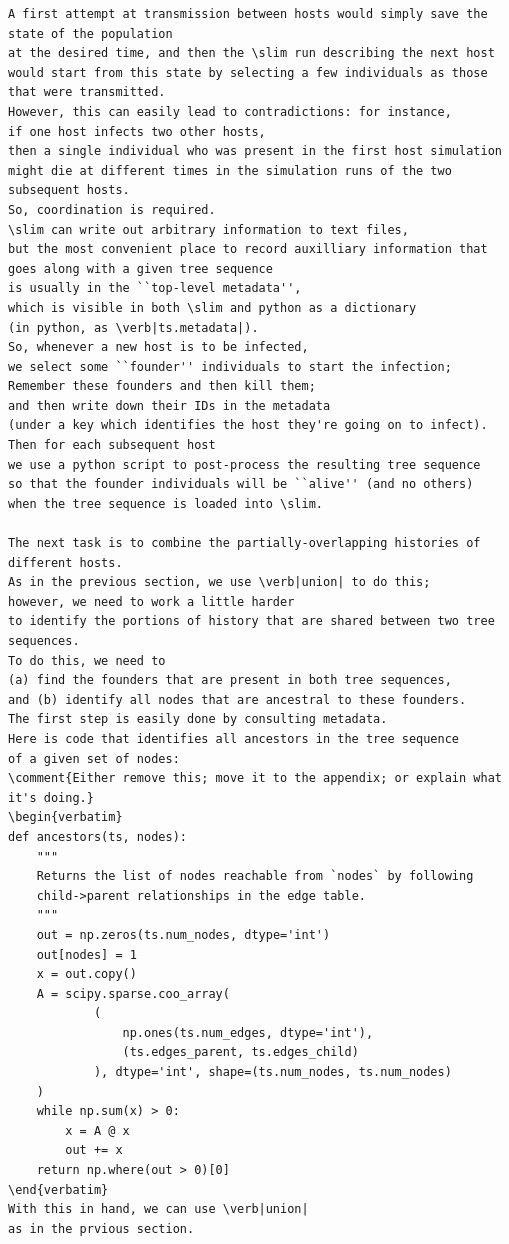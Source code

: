 \documentclass[12pt]{article}
\newcommand{\slim}[0]{\texttt{SLiM}\xspace}
\newcommand{\comment}[1]{\textit{\color{green} #1}}
\begin{document}
\begin{lstlisting}[language=slim]
A first attempt at transmission between hosts would simply save the state of the population
at the desired time, and then the \slim run describing the next host
would start from this state by selecting a few individuals as those that were transmitted.
However, this can easily lead to contradictions: for instance,
if one host infects two other hosts,
then a single individual who was present in the first host simulation
might die at different times in the simulation runs of the two subsequent hosts.
So, coordination is required.
\slim can write out arbitrary information to text files,
but the most convenient place to record auxilliary information that goes along with a given tree sequence
is usually in the ``top-level metadata'',
which is visible in both \slim and python as a dictionary
(in python, as \verb|ts.metadata|).
So, whenever a new host is to be infected,
we select some ``founder'' individuals to start the infection;
Remember these founders and then kill them;
and then write down their IDs in the metadata
(under a key which identifies the host they're going on to infect).
Then for each subsequent host
we use a python script to post-process the resulting tree sequence
so that the founder individuals will be ``alive'' (and no others)
when the tree sequence is loaded into \slim.

The next task is to combine the partially-overlapping histories of different hosts.
As in the previous section, we use \verb|union| to do this;
however, we need to work a little harder
to identify the portions of history that are shared between two tree sequences.
To do this, we need to
(a) find the founders that are present in both tree sequences,
and (b) identify all nodes that are ancestral to these founders.
The first step is easily done by consulting metadata.
Here is code that identifies all ancestors in the tree sequence
of a given set of nodes:
\comment{Either remove this; move it to the appendix; or explain what it's doing.}
\begin{verbatim}
def ancestors(ts, nodes):
    """
    Returns the list of nodes reachable from `nodes` by following
    child->parent relationships in the edge table.
    """
    out = np.zeros(ts.num_nodes, dtype='int')
    out[nodes] = 1
    x = out.copy()
    A = scipy.sparse.coo_array(
            (
                np.ones(ts.num_edges, dtype='int'),
                (ts.edges_parent, ts.edges_child)
            ), dtype='int', shape=(ts.num_nodes, ts.num_nodes)
    )
    while np.sum(x) > 0:
        x = A @ x
        out += x
    return np.where(out > 0)[0]
\end{verbatim}
With this in hand, we can use \verb|union|
as in the prvious section.



\end{lstlisting}
\end{document}
